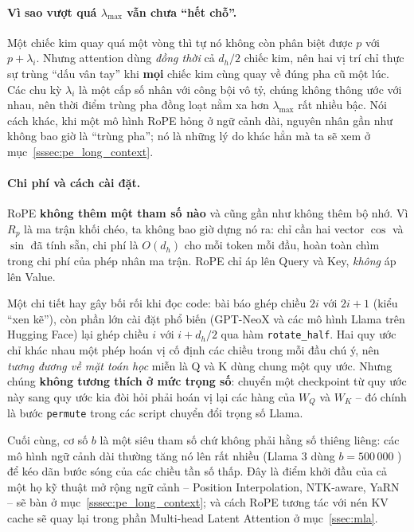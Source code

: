\paragraph{Vì sao vượt quá $\lambda_{\max}$ vẫn chưa “hết chỗ”.} Một chiếc kim quay quá một vòng thì tự nó không còn phân biệt được $p$ với $p + \lambda_i$. Nhưng attention dùng \emph{đồng thời} cả $d_h/2$ chiếc kim, nên hai vị trí chỉ thực sự trùng “dấu vân tay” khi \textbf{mọi} chiếc kim cùng quay về đúng pha cũ một lúc. Các chu kỳ $\lambda_i$ là một cấp số nhân với công bội vô tỷ, chúng không thông ước với nhau, nên thời điểm trùng pha đồng loạt nằm xa hơn $\lambda_{\max}$ rất nhiều bậc. Nói cách khác, khi một mô hình RoPE hỏng ở ngữ cảnh dài, nguyên nhân gần như không bao giờ là “trùng pha”; nó là những lý do khác hẳn mà ta sẽ xem ở mục~\ref{sssec:pe_long_context}.

\paragraph{Chi phí và cách cài đặt.} RoPE \textbf{không thêm một tham số nào} và cũng gần như không thêm bộ nhớ. Vì $R_p$ là ma trận khối chéo, ta không bao giờ dựng nó ra: chỉ cần hai vector $\cos$ và $\sin$ đã tính sẵn, chi phí là $O(d_h)$ cho mỗi token mỗi đầu, hoàn toàn chìm trong chi phí của phép nhân ma trận. RoPE chỉ áp lên Query và Key, \emph{không} áp lên Value.

Một chi tiết hay gây bối rối khi đọc code: bài báo ghép chiều $2i$ với $2i{+}1$ (kiểu “xen kẽ”), còn phần lớn cài đặt phổ biến (GPT-NeoX và các mô hình Llama trên Hugging Face) lại ghép chiều $i$ với $i + d_h/2$ qua hàm \texttt{rotate\_half}. Hai quy ước chỉ khác nhau một phép hoán vị cố định các chiều trong mỗi đầu chú ý, nên \emph{tương đương về mặt toán học} miễn là Q và K dùng chung một quy ước. Nhưng chúng \textbf{không tương thích ở mức trọng số}: chuyển một checkpoint từ quy ước này sang quy ước kia đòi hỏi phải hoán vị lại các hàng của $W_Q$ và $W_K$ -- đó chính là bước \texttt{permute} trong các script chuyển đổi trọng số Llama.

Cuối cùng, cơ số $b$ là một siêu tham số chứ không phải hằng số thiêng liêng: các mô hình ngữ cảnh dài thường tăng nó lên rất nhiều (Llama 3 dùng $b = 500\,000$ \cite{grattafiori2024llama3}) để kéo dãn bước sóng của các chiều tần số thấp. Đây là điểm khởi đầu của cả một họ kỹ thuật mở rộng ngữ cảnh -- Position Interpolation, NTK-aware, YaRN -- sẽ bàn ở mục~\ref{sssec:pe_long_context}; và cách RoPE tương tác với nén KV cache sẽ quay lại trong phần Multi-head Latent Attention ở mục~\ref{ssec:mla}.

